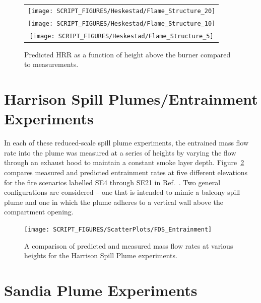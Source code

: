 \begin{figure}[p]
\begin{center}
\begin{tabular}{c}
\texttt{[image: SCRIPT\_FIGURES/Heskestad/Flame\_Structure\_20]} \\
\texttt{[image: SCRIPT\_FIGURES/Heskestad/Flame\_Structure\_10]} \\
\texttt{[image: SCRIPT\_FIGURES/Heskestad/Flame\_Structure\_5]}
\end{tabular}
\end{center}
\caption[Predicted HRR as a function of height above the burner]{Predicted HRR as a function of height above the burner compared to measurements.}
\label{Flame_Structure}
\end{figure}



\clearpage

\section{Harrison Spill Plumes/Entrainment Experiments}
\label{Harrison_Spill_Plumes}

In each of these reduced-scale spill plume experiments, the entrained mass flow rate into the plume was measured at a series of heights by varying the flow through an exhaust hood to maintain a constant smoke layer depth.  Figure~\ref{Entrainment} compares measured and predicted entrainment rates at five different elevations for the fire scenarios labelled SE4 through SE21 in Ref.~\cite{Harrison:2009}. Two general configurations are considered -- one that is intended to mimic a balcony spill plume and one in which the plume adheres to a vertical wall above the compartment opening.

\begin{figure}[h]
\begin{center}
\texttt{[image: SCRIPT\_FIGURES/ScatterPlots/FDS\_Entrainment]}
\caption[Summary of plume entrainment predictions]{A comparison of predicted and measured mass flow rates at various heights for the Harrison Spill Plume experiments.}
\label{Entrainment}
\end{center}
\end{figure}




\clearpage

\section{Sandia Plume Experiments}


